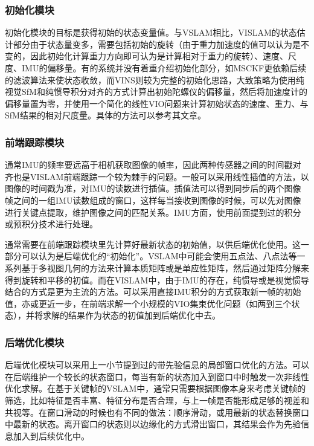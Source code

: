 \subsubsection{初始化模块}

初始化模块的目标是获得初始的状态变量值。与VSLAM相比，VISLAM的状态估计部分由于状态量变多，需要包括初始的旋转（由于重力加速度的值可以认为是不变的，因此初始化计算重力方向即可认为是计算相对于重力的旋转）、速度、尺度、IMU的偏移量。有的系统并没有着重介绍初始化部分，如MSCKF\citep{mourikis2007multi}更依赖后续的滤波算法来使状态收敛，而VINS\citep{li2017monocular}则较为完整的初始化思路，大致策略为使用纯视觉SfM和纯惯导积分对齐的方式计算出初始陀螺仪的偏移量，然后将加速度计的偏移量置为零，并使用一个简化的线性VIO问题来计算初始状态的速度、重力、与SfM结果的相对尺度量。具体的方法可以参考其文章。

\subsubsection{前端跟踪模块}

通常IMU的频率要远高于相机获取图像的帧率，因此两种传感器之间的时间戳对齐也是VISLAM前端跟踪一个较为棘手的问题。一般可以采用线性插值的方法，以图像的时间戳为准，对IMU的读数进行插值。插值法可以得到同步后的两个图像帧之间的一组IMU读数组成的窗口，这样每当接收到图像的时候，可以先对图像进行关键点提取，维护图像之间的匹配关系。IMU方面，使用前面提到过的积分或预积分技术进行处理。

通常需要在前端跟踪模块里先计算好最新状态的初始值，以供后端优化使用。这一部分可以认为是后端优化的“初始化”。VSLAM中可能会使用五点法、八点法等一系列基于多视图几何的方法来计算本质矩阵或是单应性矩阵，然后通过矩阵分解来得到旋转和平移的初值。而在VISLAM中，由于IMU的存在，纯惯导或是视觉惯导结合的方式是更为主流的方法。可以采用直接IMU积分的方式获取新一帧的初始值，亦或更近一步，在前端求解一个小规模的VIO集束优化问题（如两到三个状态），并将求解的结果作为状态的初值加到后端优化中去。

\subsubsection{后端优化模块}

后端优化模块可以采用上一小节提到过的带先验信息的局部窗口优化的方法。可以在后端维护一个较长的状态窗口，每当有新的状态加入到窗口中时触发一次非线性优化求解。在基于关键帧的VSLAM中，通常只需要根据图像本身来考虑关键帧的筛选，比如特征是否丰富、特征分布是否合理，与上一帧是否能形成足够的视差和共视等。在窗口滑动的时候也有不同的做法：顺序滑动，或用最新的状态替换窗口中最新的状态。离开窗口的状态则以边缘化的方式滑出窗口，其结果会作为先验信息加入到后续优化中。

